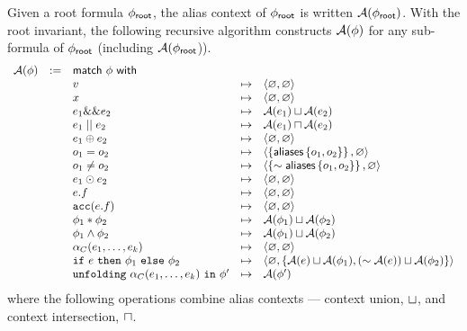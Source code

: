 Given a root formula $\phi_\textsf{root}$, the alias context of $\phi_\textsf{root}$ is written $\mathcal{A}(\phi_\textsf{root})$. With the root invariant, the following recursive algorithm constructs $\mathcal{A}(\phi)$ for any sub-formula of $\phi_\textsf{root}$ (including $\mathcal{A}(\phi_\textsf{root}$)).
%
\begin{align*}
\begin{array}{rclcl}
\mathcal{A}(\phi) &:=& \textsf{match} \ \phi \ \textsf{with} \\
&& v &\mapsto&
  \langle \varnothing, \varnothing \rangle
\\
&& x &\mapsto&
  \langle \varnothing, \varnothing \rangle
\\
&& e_1 \&\& e_2 &\mapsto&
  \mathcal{A}(e_1) \sqcup \mathcal{A}(e_2)
\\
&& e_1 \mid\mid e_2 &\mapsto&
  \mathcal{A}(e_1) \sqcap \mathcal{A}(e_2)
\\
&& e_1 \oplus e_2 &\mapsto&
  \langle \varnothing, \varnothing \rangle
\\
&& o_1 = o_2 &\mapsto&
  \langle \left\{ \textsf{aliases}\left\{ o_1, o_2 \right\} \right\}, \varnothing \rangle
\\
&& o_1 \neq o_2 &\mapsto&
  \langle \left\{ \sim \textsf{aliases}\left\{ o_1, o_2 \right\} \right\}, \varnothing \rangle
\\
&& e_1 \odot e_2 &\mapsto&
  \langle \varnothing, \varnothing \rangle
\\
&& e.f &\mapsto&
  \langle \varnothing, \varnothing \rangle
\\
&& \texttt{acc}(e.f) &\mapsto&
  \langle \varnothing, \varnothing \rangle
\\
&& \phi_1 \ast \phi_2 &\mapsto&
  \mathcal{A}(\phi_1) \sqcup \mathcal{A}(\phi_2)
\\
&& \phi_1 \land \phi_2 &\mapsto&
  \mathcal{A}(\phi_1) \sqcup \mathcal{A}(\phi_2)
\\
&& \alpha_C(e_1, \dots, e_k) &\mapsto&
  \langle \varnothing, \varnothing \rangle
\\
&& \texttt{if} \ e \ \texttt{then} \ \phi_1 \ \texttt{else} \ \phi_2 &\mapsto&
  \langle \varnothing, \left\{  \mathcal{A}(e) \sqcup \mathcal{A}(\phi_1), (\sim \mathcal{A}(e)) \sqcup \mathcal{A}(\phi_2)  \right\} \rangle
\\
&& \texttt{unfolding} \ \alpha_C(e_1, \dots, e_k) \ \texttt{in} \ \phi^\prime &\mapsto&
  \mathcal{A}(\phi^\prime)
\end{array}
\end{align*}
%
where the following operations combine alias contexts --- context union, $\sqcup$, and context intersection, $\sqcap$.
%
